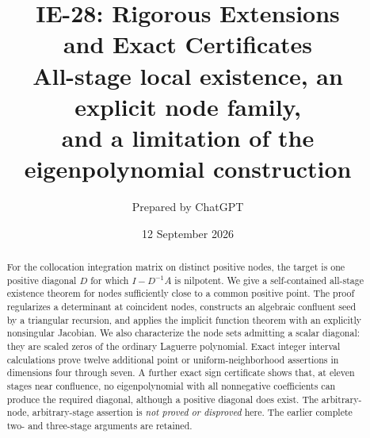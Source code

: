 \documentclass[11pt]{article}
\title{\textbf{IE-28: Rigorous Extensions\\and Exact Certificates}\\[6pt]
\large All-stage local existence, an explicit node family,\\and a limitation of the eigenpolynomial construction}
\author{Prepared by ChatGPT}
\date{12 September 2026}
\theoremstyle{remark}\newtheorem{remark}[theorem]{Remark}
\begin{document}
\maketitle\thispagestyle{empty}
\begin{abstract}
For the collocation integration matrix on distinct positive nodes, the target is
one positive diagonal $D$ for which $I-D^{-1}A$ is nilpotent. We give a
self-contained all-stage existence theorem for nodes sufficiently close to a
common positive point. The proof regularizes a determinant at coincident nodes,
constructs an algebraic confluent seed by a triangular recursion, and applies
the implicit function theorem with an explicitly nonsingular Jacobian.
We also characterize the node sets admitting a scalar diagonal: they are scaled
zeros of the ordinary Laguerre polynomial. Exact integer interval calculations
prove twelve additional point or uniform-neighborhood assertions in dimensions
four through seven. A further exact sign certificate shows that, at eleven
stages near confluence, no eigenpolynomial with all nonnegative coefficients
can produce the required diagonal, although a positive diagonal does exist.
The arbitrary-node, arbitrary-stage assertion is \emph{not proved or disproved}
here. The earlier complete two- and three-stage arguments are retained.
\end{abstract}

\begin{center}
\end{center}
\end{document}
